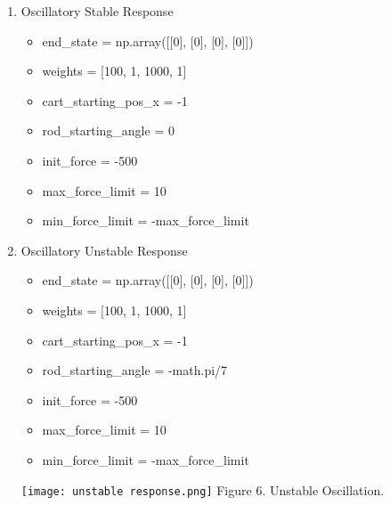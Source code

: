 \documentclass{article}
\begin{document}
\begin{enumerate}
    \item Oscillatory Stable Response
        \begin{itemize}
            \item end\_state = np.array([[0], [0], [0], [0]])
            \item weights = [100, 1, 1000, 1]
            \item cart\_starting\_pos\_x = -1
            \item rod\_starting\_angle = 0
            \item init\_force = -500
            \item max\_force\_limit = 10
            \item min\_force\_limit = -max\_force\_limit
        \end{itemize}
        
    \item Oscillatory Unstable Response
        \begin{itemize}
            \item end\_state = np.array([[0], [0], [0], [0]])
            \item weights = [100, 1, 1000, 1]
            \item cart\_starting\_pos\_x = -1
            \item rod\_starting\_angle = -math.pi/7
            \item init\_force = -500
            \item max\_force\_limit = 10
            \item min\_force\_limit = -max\_force\_limit
        \end{itemize}
        
        \begin{center}
            \texttt{[image: unstable response.png]}
            Figure 6. Unstable Oscillation.            
        \end{center}


\end{enumerate}
\end{document}
